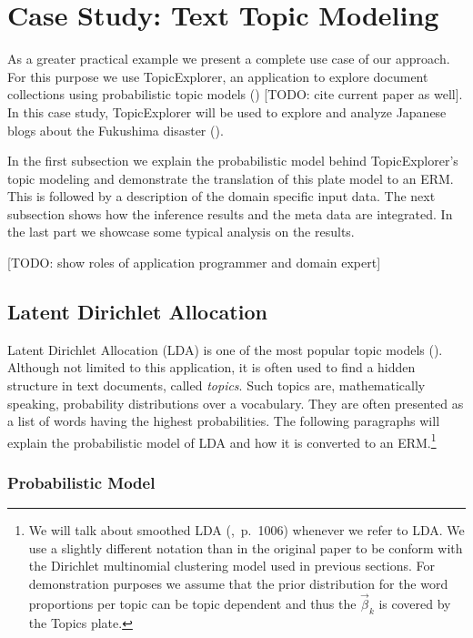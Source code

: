 \section{Case Study: Text Topic Modeling}\label{sec:casestudy}

As a greater practical example we present a complete use case of our approach. For this purpose we use TopicExplorer, an application to explore document collections using probabilistic topic models (\cite{hinneburg2012topicexplorer}) [TODO: cite current paper as well]. In this case study, TopicExplorer will be used to explore and analyze Japanese blogs about the Fukushima disaster (\cite{ines2011fukushima}).

In the first subsection we explain the probabilistic model behind TopicExplorer's topic modeling and demonstrate the translation of this plate model to an ERM. This is followed by a description of the domain specific input data. The next subsection shows how the inference results and the meta data are integrated. In the last part we showcase some typical analysis on the results.

[TODO: show roles of application programmer and domain expert]

\subsection{Latent Dirichlet Allocation}

Latent Dirichlet Allocation (LDA) is one of the most popular topic models (\cite{blei2003latent}). Although not limited to this application, it is often used to find a hidden structure in text documents, called \emph{topics}. Such topics are, mathematically speaking, probability distributions over a vocabulary. They are often presented as a list of words having the highest probabilities. The following paragraphs will explain the probabilistic model of LDA and how it is converted to an ERM.\footnote{We will talk about smoothed LDA (\cite{blei2003latent},~p.~1006) whenever we refer to LDA. We use a slightly different notation than in the original paper to be conform with the Dirichlet multinomial clustering model used in previous sections. For demonstration purposes we assume that the prior distribution for the word proportions per topic can be topic dependent and thus the $\vec \beta_k$ is covered by the Topics plate.}

\subsubsection{Probabilistic Model}

